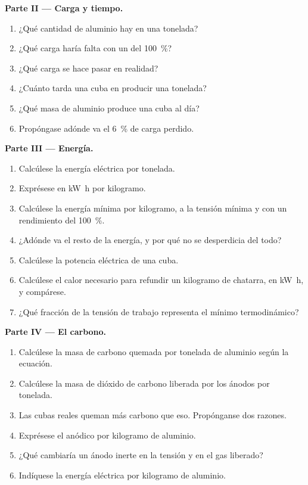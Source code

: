 \begin{problem}
\medskip
\noindent\textbf{Parte II --- Carga y tiempo.}
\begin{enumerate}[resume]
  \item ¿Qué cantidad de aluminio hay en una tonelada?
  \item ¿Qué carga haría falta con un  del 100~\%?
  \item ¿Qué carga se hace pasar en realidad?
  \item ¿Cuánto tarda una cuba en producir una tonelada?
  \item ¿Qué masa de aluminio produce una cuba al día?
  \item Propóngase adónde va el 6~\% de carga perdido.
\end{enumerate}

\medskip
\noindent\textbf{Parte III --- Energía.}
\begin{enumerate}[resume]
  \item Calcúlese la energía eléctrica por tonelada.
  \item Exprésese en \unit{kW.h} por kilogramo.
  \item Calcúlese la energía mínima por kilogramo, a la tensión mínima y con un
        rendimiento del 100~\%.
  \item ¿Adónde va el resto de la energía, y por qué no se desperdicia
        del todo?
  \item Calcúlese la potencia eléctrica de una cuba.
  \item Calcúlese el calor necesario para refundir un kilogramo de chatarra, en
        \unit{kW.h}, y compárese.
  \item ¿Qué fracción de la tensión de trabajo representa el mínimo termodinámico?
\end{enumerate}

\medskip
\noindent\textbf{Parte IV --- El carbono.}
\begin{enumerate}[resume]
  \item Calcúlese la masa de carbono quemada por tonelada de aluminio según la
        ecuación.
  \item Calcúlese la masa de dióxido de carbono liberada por los ánodos por tonelada.
  \item Las cubas reales queman más carbono que eso. Propónganse dos razones.
  \item Exprésese el  anódico por kilogramo de aluminio.
  \item ¿Qué cambiaría un ánodo inerte en la tensión y en el gas
        liberado?
  \item Indíquese la energía eléctrica por kilogramo de aluminio.
\end{enumerate}
\end{problem}
